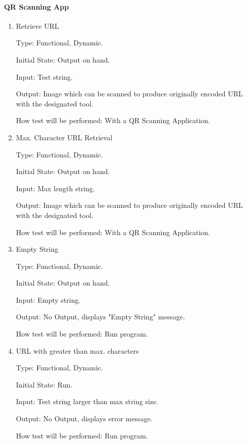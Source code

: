 \documentclass[12pt, titlepage]{article}
\begin{document}
\paragraph{QR Scanning App}

\begin{enumerate}

\item{Retrieve URL\\}

Type: Functional, Dynamic.
					
Initial State: Output on hand.
					
Input: Test string.
					
Output: Image which can be scanned to produce originally encoded URL with the designated tool.
					
How test will be performed: With a QR Scanning Application.
					
\item{Max. Character URL Retrieval \\}

Type: Functional, Dynamic.
			
Initial State: Output on hand.
					
Input: Max length string.
					
Output: Image which can be scanned to produce originally encoded URL with the designated tool.  
					
How test will be performed: With a QR Scanning Application.


\item{Empty String\\}

Type: Functional, Dynamic.
					
Initial State: Output on hand.
					
Input: Empty string.
					
Output: No Output, displays "Empty String" message.
					
How test will be performed: Run program.


\item{URL with greater than max. characters\\}

Type: Functional, Dynamic.
					
Initial State: Run.
					
Input: Test string larger than max string size.
					
Output: No Output, displays error message.
					
How test will be performed: Run program.

\end{enumerate}
\end{document}
